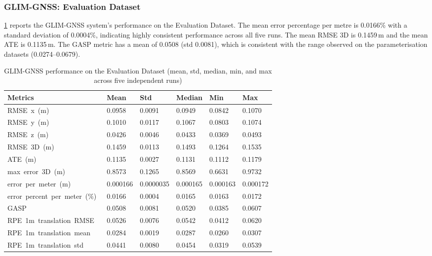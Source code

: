 \subsubsection{GLIM-GNSS: Evaluation Dataset}

\cref{tab:eval_proposed_performance} reports the GLIM-GNSS system's performance on the Evaluation Dataset. The mean error percentage per metre is 0.0166\% with a standard deviation of 0.0004\%, indicating highly consistent performance across all five runs. The mean RMSE 3D is 0.1459\,m and the mean ATE is 0.1135\,m. The GASP metric has a mean of 0.0508 (std 0.0081), which is consistent with the range observed on the parameterisation datasets (0.0274--0.0679).

\begin{table}[htbp]
\centering
\caption{GLIM-GNSS performance on the Evaluation Dataset (mean, std, median, min, and max across five independent runs)}
\label{tab:eval_proposed_performance}
\begin{tabularx}{\textwidth}{lXXXXX}
\toprule
\textbf{Metrics} & \textbf{Mean} & \textbf{Std} & \textbf{Median} & \textbf{Min} & \textbf{Max} \\ \midrule
RMSE\ x\ (m)\        & 0.0958   & 0.0091   & 0.0949   & 0.0842   & 0.1070   \\
RMSE\ y\ (m)\        & 0.1010   & 0.0117   & 0.1067   & 0.0803   & 0.1074   \\
RMSE\ z\ (m)\        & 0.0426   & 0.0046   & 0.0433   & 0.0369   & 0.0493   \\
RMSE\ 3D\ (m)\       & 0.1459   & 0.0113   & 0.1493   & 0.1264   & 0.1535   \\
ATE\ (m)\            & 0.1135   & 0.0027   & 0.1131   & 0.1112   & 0.1179   \\
max\ error\ 3D\ (m)\ & 0.8573   & 0.1265   & 0.8569   & 0.6631   & 0.9732   \\
error\ per\ meter\ (m)\        & 0.000166 & 0.0000035& 0.000165 & 0.000163 & 0.000172 \\
error\ percent\ per\ meter\ (\%)\ & 0.0166   & 0.0004   & 0.0165   & 0.0163   & 0.0172   \\
GASP\                & 0.0508   & 0.0081   & 0.0520   & 0.0385   & 0.0607   \\
RPE\ 1m\ translation\ RMSE\  & 0.0526 & 0.0076 & 0.0542 & 0.0412 & 0.0620 \\
RPE\ 1m\ translation\ mean\  & 0.0284 & 0.0019 & 0.0287 & 0.0260 & 0.0307 \\
RPE\ 1m\ translation\ std\   & 0.0441 & 0.0080 & 0.0454 & 0.0319 & 0.0539 \\

\end{tabularx}
\end{table}
